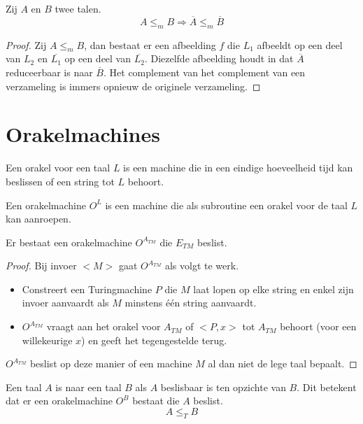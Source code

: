 \documentclass[main.tex]{subfiles}
\begin{document}
\begin{st}
  \label{st:reduceerbaarheid-taal-complement}
  Zij $A$ en $B$ twee talen.
  \[ A \le_m B \Rightarrow \overline{A} \le_m \overline{B} \]

  \begin{proof}
    Zij $A \le_{m} B$, dan bestaat er een afbeelding $f$ die $L_{1}$ afbeeldt op een deel van $L_{2}$ en $\overline{L_{1}}$ op een deel van $\overline{L_{2}}$.
    Diezelfde afbeelding houdt in dat $\overline{A}$ reduceerbaar is naar $\overline{B}$.
    Het complement van het complement van een verzameling is immers opnieuw de originele verzameling.
  \end{proof}
\end{st}


\section{Orakelmachines}
\label{sec:orakelmachines}

\begin{de}
  Een orakel voor een taal $L$ is een machine die in een eindige hoeveelheid tijd kan beslissen of een string tot $L$ behoort.
\end{de}

\begin{de}
  Een orakelmachine $O^{L}$ is een machine die als subroutine een orakel voor de taal $L$ kan aanroepen.
\end{de}

\begin{st}
  Er bestaat een orakelmachine $O^{A_{TM}}$ die $E_{TM}$ beslist.

  \begin{proof}
    Bij invoer $<M>$ gaat $O^{A_{TM}}$ als volgt te werk.
    \begin{itemize}
    \item Constreert een Turingmachine $P$ die $M$ laat lopen op elke string en enkel zijn invoer aanvaardt als $M$ minstens \'e\'en string aanvaardt.
    \item $O^{A_{TM}}$ vraagt aan het orakel voor $A_{TM}$ of $<P,x>$ tot $A_{TM}$ behoort (voor een willekeurige $x$) en geeft het tegengestelde terug.
    \end{itemize}
    $O^{A_{TM}}$ beslist op deze manier of een machine $M$ al dan niet de lege taal bepaalt.
  \end{proof}
\end{st}

\begin{de}
  Een taal $A$ is  naar een taal $B$ als $A$ beslisbaar is ten opzichte van $B$.
  Dit betekent dat er een orakelmachine $O^{B}$ bestaat die $A$ beslist.
  \[ A \le_{T} B \]
\end{de}
\end{document}
